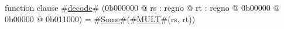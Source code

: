 function clause #\hyperref[zdecode]{decode}# (0b000000 @ rs : regno @ rt : regno @ 0b00000 @ 0b00000 @ 0b011000) =
  #\hyperref[zSome]{Some}#(#\hyperref[zMULT]{MULT}#(rs, rt))

